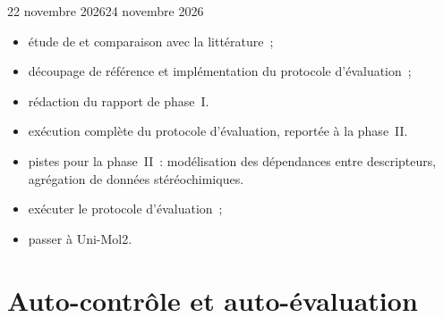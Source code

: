 \begin{fichesuivi}{22 novembre 2026}{24 novembre 2026}

   \begin{travaileffectue}
      \begin{itemize}
         \item étude de \cite{Han-2026} et comparaison avec la littérature~;
         \item découpage de référence et implémentation du protocole d'évaluation~;
         \item rédaction du rapport de phase~I.
      \end{itemize}
   \end{travaileffectue}

   \begin{travailnoneffectue}
      \begin{itemize}
         \item exécution complète du protocole d'évaluation, reportée à la phase~II.
      \end{itemize}
   \end{travailnoneffectue}

   \begin{echange}
      \begin{itemize}
         \item pistes pour la phase~II~: modélisation des dépendances entre descripteurs, agrégation de données stéréochimiques.
      \end{itemize}
   \end{echange}

   \begin{planification}
      \begin{itemize}
         \item exécuter le protocole d'évaluation~;
         \item passer à Uni-Mol2.
      \end{itemize}
   \end{planification}
\end{fichesuivi}

\printweeksummary


\chapter{Auto-contrôle et auto-évaluation}
\label{ann:AutoEvaluation}

